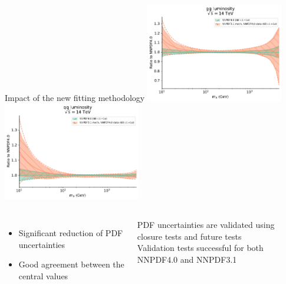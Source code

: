 \documentclass[aspectratio=169,9pt]{beamer}
\begin{document}
\begin{frame}[t]{Impact of the new fitting methodology}
	\includegraphics[width=0.45\textwidth]{lumi1d_gg_NNPDF31meth_NNPDF40data}
	\includegraphics[width=0.45\textwidth]{lumi1d_qq_NNPDF31meth_NNPDF40data}
	\begin{columns}
			\begin{itemize}
	    	        \item Significant reduction of PDF uncertainties
		        \item Good agreement between the central values
		    \end{itemize}
            \begin{block}{}
                \fontsize{7}{6}\selectfont
                PDF uncertainties are validated using closure tests and future tests\\
                Validation tests successful for both NNPDF4.0 and NNPDF3.1 
            \end{block}
    \end{columns}
\end{frame}



\end{document}
